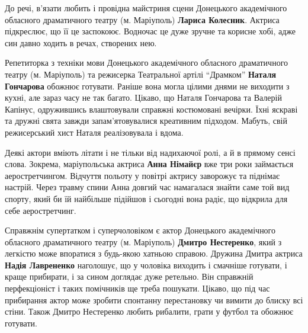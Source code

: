 
До речі, в'язати любить і провідна майстриня сцени Донецького академічного
обласного драматичного театру (м. Маріуполь) \textbf{Лариса Колесник}. Актриса
підкреслює, що її це заспокоює. Водночас це дуже зручне та корисне хобі, адже
син давно ходить в речах, створених нею.


Репетиторка з техніки мови Донецького академічного обласного драматичного
театру (м. Маріуполь) та режисерка Театральної артілі \enquote{Драмком} \textbf{Наталя
Гончарова} обожнює готувати. Раніше вона могла цілими днями не виходити з кухні,
але зараз часу не так багато. Цікаво, що Наталя Гончарова та Валерій Капінус,
одружившись влаштовували справжні костюмовані вечірки. Їхні яскраві та дружні
свята завжди запам'ятовувалися креативним підходом. Мабуть, свій режисерський
хист Наталя реалізовувала і вдома.


Деякі актори вміють літати і не тільки від надихаючої ролі, а й в прямому сенсі
слова. Зокрема, маріупольська актриса \textbf{Анна Німайєр} вже три роки займається
аеростретчингом. Відчуття польоту у повітрі актрису заворожує та піднімає
настрій. Через травму спини Анна довгий час намагалася знайти саме той вид
спорту, який би їй найбільше підійшов і сьогодні вона радіє, що відкрила для
себе аеростретчинг.


Справжнім супертатком і суперчоловіком є актор Донецького академічного
обласного драматичного театру (м. Маріуполь) \textbf{Дмитро Нестеренко}, який з легкістю
може впоратися з будь-якою хатньою справою. Дружина Дмитра актриса \textbf{Надія
Лаврененко} наголошує, що у чоловіка виходить і смачніше готувати, і краще
прибирати, і за сином доглядає дуже ретельно. Він справжній перфекціоніст і
таких помічників ще треба пошукати. Цікаво, що під час прибирання актор може
зробити спонтанну перестановку чи вимити до блиску всі стіни. Також Дмитро
Нестеренко любить рибалити, грати у футбол та обожнює готувати.


